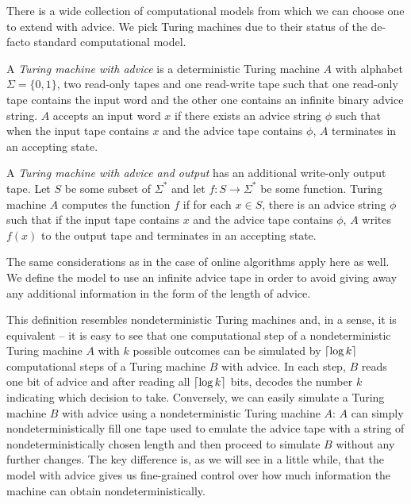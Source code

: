 There is a wide collection of computational models from which we can
choose one to extend with advice. We pick Turing machines due to their
status of the de-facto standard computational model.

\begin{definition}\label{definition:turing-advice}
    A \emph{Turing machine with advice} is a deterministic Turing machine
    $A$ with alphabet $\Sigma = \{0,1\}$, two read-only tapes and one
    read-write tape such that one read-only tape contains the input word
    and the other one contains an infinite binary advice string. $A$
    accepts an input word $x$ if there exists an advice string $\phi$ such
    that when the input tape contains $x$ and the advice tape contains
    $\phi$, $A$ terminates in an accepting state.

    A \emph{Turing machine with advice and output} has an additional
    write-only output tape. Let $S$ be some subset of $\Sigma^*$ and let
    $f: S \to \Sigma^*$ be some function. Turing machine $A$ computes the
    function $f$ if for each $x \in S$, there is an advice string $\phi$
    such that if the input tape contains $x$ and the advice tape contains
    $\phi$, $A$ writes $f(x)$ to the output tape and terminates in an
    accepting state.
\end{definition}

The same considerations as in the case of online algorithms apply here as
well. We define the model to use an infinite advice tape in order to avoid
giving away any additional information in the form of the length of
advice.

This definition resembles nondeterministic Turing machines and, in a
sense, it is equivalent -- it is easy to see that one computational step
of a nondeterministic Turing machine $A$ with $k$ possible outcomes can be
simulated by $\lceil\log{}k\rceil$ computational steps of a Turing machine $B$
with advice. In each step, $B$ reads one bit of advice and after reading
all $\lceil\log{}k\rceil$ bits, decodes the number $k$ indicating which
decision to take. Conversely, we can easily simulate a Turing machine $B$ with
advice using a nondeterministic Turing machine $A$: $A$ can simply
nondeterministically fill one tape used to emulate the advice tape with a
string of nondeterministically chosen length and then proceed to simulate
$B$ without any further changes. The key difference is, as we will see in
a little while, that the model with advice gives us fine-grained control
over how much information the machine can obtain nondeterministically.


